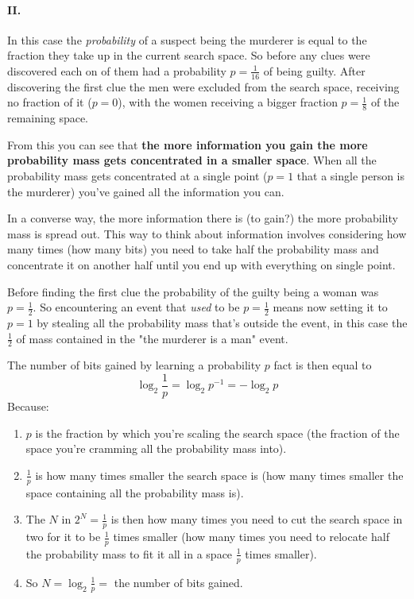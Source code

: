 \paragraph{II.}
In this case the \textit{probability} of a suspect being the murderer is equal to the fraction they take up in the current search space. So before any clues were discovered each on of them had a probability $p=\frac{1}{16}$ of being guilty.
After discovering the first clue the men were excluded from the search space, receiving no fraction of it ($p=0$), with the women receiving a bigger fraction $p=\frac{1}{8}$ of the remaining space.
\par
From this you can see that \textbf{the more information you gain the more probability mass gets concentrated in a smaller space}. When all the probability mass gets concentrated at a single point ($p=1$ that a single person is the murderer) you've gained all the information you can.
\par
In a converse way, the more information there is (to gain?) the more probability mass is spread out. This way to think about information involves considering how many times (how many bits) you need to take half the probability mass and concentrate it on another half until you end up with everything on single point.
\par
Before finding the first clue the probability of the guilty being a woman was $p=\frac{1}{2}$. So encountering an event that \textit{used} to be $p=\frac{1}{2}$ means now setting it to $p=1$ by stealing all the probability mass that's outside the event, in this case the $\frac{1}{2}$ of mass contained in the "the murderer is a man" event.
\par
The number of bits gained by learning a probability $p$ fact is then equal to
$$\log_2{\frac{1}{p}}=\log_2{p^{-1}}=-\log_2{p}$$
Because:\begin{enumerate}
    \item $p$ is the fraction by which you're scaling the search space (the fraction of the space you're cramming all the probability mass into).
    \item $\frac{1}{p}$ is how many times smaller the search space is (how many times smaller the space containing all the probability mass is).
    \item The $N$ in $2^N=\frac{1}{p}$ is then how many times you need to cut the search space in two for it to be $\frac{1}{p}$ times smaller (how many times you need to relocate half the probability mass to fit it all in a space $\frac{1}{p}$ times smaller).
    \item So $N=\log_2{\frac{1}{p}} = $ the number of bits gained.
\end{enumerate}

